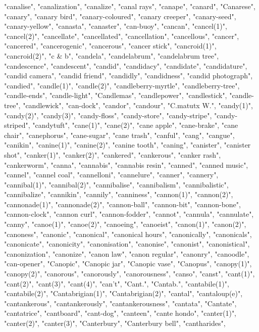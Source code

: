 "canalise",
"canalization",
"canalize",
"canal rays",
"canape",
"canard",
"Canarese",
"canary",
"canary bird",
"canary-coloured",
"canary creeper",
"canary-seed",
"canary-yellow",
"canasta",
"canaster",
"can-buoy",
"cancan",
"cancel(1)",
"cancel(2)",
"cancellate",
"cancellated",
"cancellation",
"cancellous",
"cancer",
"cancered",
"cancerogenic",
"cancerous",
"cancer stick",
"cancroid(1)",
"cancroid(2)",
"c \& b",
"candela",
"candelabrum",
"candelabrum tree",
"candescence",
"candescent",
"candid",
"candidacy",
"candidate",
"candidature",
"candid camera",
"candid friend",
"candidly",
"candidness",
"candid photograph",
"candied",
"candle(1)",
"candle(2)",
"candleberry-myrtle",
"candleberry-tree",
"candle-ends",
"candle-light",
"Candlemas",
"candlepower",
"candlestick",
"candle-tree",
"candlewick",
"can-dock",
"candor",
"candour",
"C.matutx W.",
"candy(1)",
"candy(2)",
"candy(3)",
"candy-floss",
"candy-store",
"candy-stripe",
"candy-striped",
"candytuft",
"cane(1)",
"cane(2)",
"cane apple",
"cane-brake",
"cane chair",
"canephorus",
"cane-sugar",
"cane trash",
"canful",
"cang",
"cangue",
"canikin",
"canine(1)",
"canine(2)",
"canine tooth",
"caning",
"canister",
"canister shot",
"canker(1)",
"canker(2)",
"cankered",
"cankerous",
"canker rash",
"cankerworm",
"canna",
"cannabis",
"cannabis resin",
"canned",
"canned music",
"cannel",
"cannel coal",
"cannelloni",
"cannelure",
"canner",
"cannery",
"cannibal(1)",
"cannibal(2)",
"cannibalise",
"cannibalism",
"cannibalistic",
"cannibalize",
"cannikin",
"cannily",
"canniness",
"cannon(1)",
"cannon(2)",
"cannonade(1)",
"cannonade(2)",
"cannon-ball",
"cannon-bit",
"cannon-bone",
"cannon-clock",
"cannon curl",
"cannon-fodder",
"cannot",
"cannula",
"cannulate",
"canny",
"canoe(1)",
"canoe(2)",
"canoeing",
"canoeist",
"canon(1)",
"canon(2)",
"canoness",
"canonic",
"canonical",
"canonical hours",
"canonically",
"canonicals",
"canonicate",
"canonicity",
"canonisation",
"canonise",
"canonist",
"canonistical",
"canonization",
"canonize",
"canon law",
"canon regular",
"canonry",
"canoodle",
"can-opener",
"Canopic",
"Canopic jar",
"Canopic vase",
"Canopus",
"canopy(1)",
"canopy(2)",
"canorous",
"canorously",
"canorousness",
"canso",
"canst",
"cant(1)",
"cant(2)",
"cant(3)",
"cant(4)",
"can't",
"Cant.",
"Cantab.",
"cantabile(1)",
"cantabile(2)",
"Cantabrigian(1)",
"Cantabrigian(2)",
"cantal",
"cantaloup(e)",
"cantankerous",
"cantankerously",
"cantankerousness",
"cantata",
"Cantate",
"cantatrice",
"cantboard",
"cant-dog",
"canteen",
"cante hondo",
"canter(1)",
"canter(2)",
"canter(3)",
"Canterbury",
"Canterbury bell",
"cantharides",
